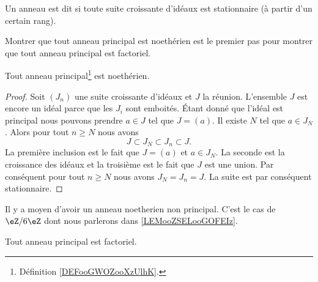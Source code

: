 \begin{definition}      \label{DEFooPWMHooCnrQuJ}
	Un anneau est dit  si toute suite croissante d'idéaux est stationnaire (à partir d'un certain rang).
\end{definition}

Montrer que tout anneau principal est noethérien est le premier pas pour montrer que tout anneau principal est factoriel.

\begin{lemma}       \label{LEMooHQPVooTfkhRV}
	Tout anneau principal\footnote{Définition \ref{DEFooGWOZooXzUlhK}.} est noethérien.
\end{lemma}

\begin{proof}
	Soit \( (J_n)\) une suite croissante d'idéaux et \( J\) la réunion. L'ensemble \( J\) est encore un idéal parce que les \( J_i\) sont emboités. Étant donné que l'idéal est principal nous pouvons prendre \( a\in J\) tel que \( J=(a)\). Il existe \( N\) tel que \( a\in J_N\). Alors pour tout \( n\geq N\) nous avons
	\begin{equation}
		J\subset J_N\subset J_n\subset J.
	\end{equation}
	La première inclusion est le fait que \( J=(a)\) et \( a\in J_N\). La seconde est la croissance des idéaux et la troisième est le fait que \( J\) est une union. Par conséquent pour tout \( n\geq N\) nous avons \( J_N=J_n=J\). La suite est par conséquent stationnaire.
\end{proof}

\begin{example}
	Il y a moyen d'avoir un anneau noetherien non principal. C'est le cas de \( \eZ/6\eZ\) dont nous parlerons dans \ref{LEMooZSELooGOFEIz}.
\end{example}

\begin{theorem}      \label{THOooANCAooBChmwp}
	Tout anneau principal est factoriel.
\end{theorem}

